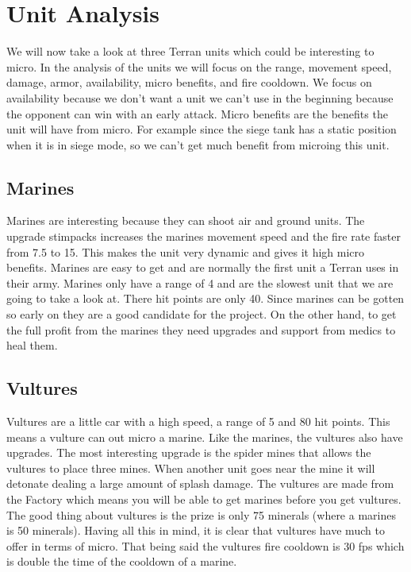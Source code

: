\section{Unit Analysis}
We will now take a look at three Terran units which could be interesting to micro. In the analysis of the units we will
focus on the range, movement speed, damage, armor, availability, micro benefits, and fire cooldown. We focus on availability because we don't want a unit we can't use in the beginning because the opponent can
win with an early attack. Micro benefits are the benefits the unit will have from micro. For example since the siege tank has a static position when it is in siege mode, so we can't get much benefit from microing
this unit. 

\subsection{Marines}
Marines are interesting because they can shoot air and ground units. The upgrade stimpacks increases the marines movement speed and the fire rate
faster from 7.5 to 15. This makes the unit very dynamic and gives it high micro benefits. Marines are easy to get and are normally the first unit a Terran uses in
their army. Marines only have a range of 4 and are the slowest unit that we are going to take a look at. There
hit points are only 40. Since marines can be gotten so early on they are a good candidate for the project. On the other hand, to get the full profit from the
marines they need upgrades and support from medics to heal them. 

\subsection{Vultures}
Vultures are a little car with a high speed, a range of 5 and 80 hit points. This means a vulture can out micro a marine. Like the marines, the
vultures also have upgrades. The most interesting upgrade is the spider mines that allows the vultures to place three mines. When another unit goes near the mine it will detonate dealing a large amount of splash damage. The vultures are made
from the Factory which means you will be able to get marines before you get vultures. The good thing about vultures is the prize is only 75 minerals (where
a marines is 50 minerals). Having all this in mind, it is clear that vultures have much to offer in terms of micro.
That being said the vultures fire cooldown is 30 fps which is double the time of the cooldown of a marine.

